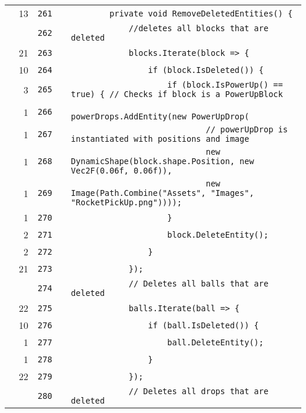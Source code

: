 \documentclass[a4paper,landscape,10pt]{article}
\begin{document}
\begin{longtable}[l]{lrrll}
\cellcolor{green} & 13 & \verb~261~ & & \verb~        private void RemoveDeletedEntities() {~\\
\cellcolor{gray} &  & \verb~262~ & & \verb~            //deletes all blocks that are deleted~\\
\cellcolor{green} & 21 & \verb~263~ & & \verb~            blocks.Iterate(block => {~\\
\cellcolor{green} & 10 & \verb~264~ & & \verb~                if (block.IsDeleted()) {~\\
\cellcolor{green} & 3 & \verb~265~ & & \verb~                    if (block.IsPowerUp() == true) { // Checks if block is a PowerUpBlock~\\
\cellcolor{green} & 1 & \verb~266~ & & \verb~                        powerDrops.AddEntity(new PowerUpDrop(~\\
\cellcolor{green} & 1 & \verb~267~ & & \verb~                            // powerUpDrop is instantiated with positions and image~\\
\cellcolor{green} & 1 & \verb~268~ & & \verb~                            new DynamicShape(block.shape.Position, new Vec2F(0.06f, 0.06f)),~\\
\cellcolor{green} & 1 & \verb~269~ & & \verb~                            new Image(Path.Combine("Assets", "Images", "RocketPickUp.png"))));~\\
\cellcolor{green} & 1 & \verb~270~ & & \verb~                    }~\\
\cellcolor{green} & 2 & \verb~271~ & & \verb~                    block.DeleteEntity();~\\
\cellcolor{green} & 2 & \verb~272~ & & \verb~                }~\\
\cellcolor{green} & 21 & \verb~273~ & & \verb~            });~\\
\cellcolor{gray} &  & \verb~274~ & & \verb~            // Deletes all balls that are deleted~\\
\cellcolor{green} & 22 & \verb~275~ & & \verb~            balls.Iterate(ball => {~\\
\cellcolor{green} & 10 & \verb~276~ & & \verb~                if (ball.IsDeleted()) {~\\
\cellcolor{green} & 1 & \verb~277~ & & \verb~                    ball.DeleteEntity();~\\
\cellcolor{green} & 1 & \verb~278~ & & \verb~                }~\\
\cellcolor{green} & 22 & \verb~279~ & & \verb~            });~\\
\cellcolor{gray} &  & \verb~280~ & & \verb~            // Deletes all drops that are deleted~\\

\end{longtable}
\end{document}
